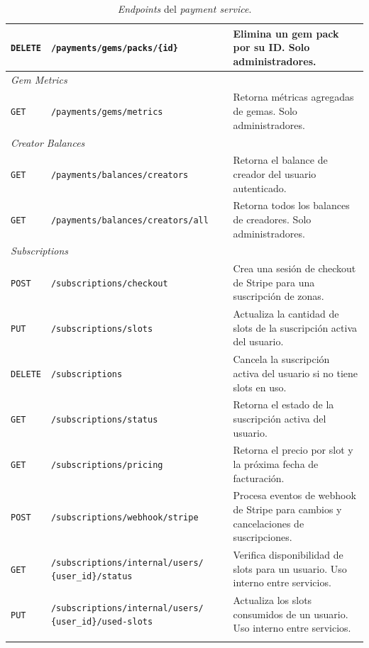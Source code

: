 \begin{longtable}{|p{2cm}|p{7cm}|p{5.5cm}|}
\hline
\texttt{DELETE} & \texttt{/payments/gems/packs/\{id\}}                          & Elimina un gem pack por su ID. Solo administradores. \\
\hline
\multicolumn{3}{|l|}{\textit{Gem Metrics}} \\
\hline
\texttt{GET}    & \texttt{/payments/gems/metrics}                               & Retorna métricas agregadas de gemas. Solo administradores. \\
\hline
\multicolumn{3}{|l|}{\textit{Creator Balances}} \\
\hline
\texttt{GET}    & \texttt{/payments/balances/creators}                          & Retorna el balance de creador del usuario autenticado. \\
\hline
\texttt{GET}    & \texttt{/payments/balances/creators/all}                      & Retorna todos los balances de creadores. Solo administradores. \\
\hline
\multicolumn{3}{|l|}{\textit{Subscriptions}} \\
\hline
\texttt{POST}   & \texttt{/subscriptions/checkout}                              & Crea una sesión de checkout de Stripe para una suscripción de zonas. \\
\hline
\texttt{PUT}    & \texttt{/subscriptions/slots}                                 & Actualiza la cantidad de slots de la suscripción activa del usuario. \\
\hline
\texttt{DELETE} & \texttt{/subscriptions}                                       & Cancela la suscripción activa del usuario si no tiene slots en uso. \\
\hline
\texttt{GET}    & \texttt{/subscriptions/status}                                & Retorna el estado de la suscripción activa del usuario. \\
\hline
\texttt{GET}    & \texttt{/subscriptions/pricing}                               & Retorna el precio por slot y la próxima fecha de facturación. \\
\hline
\texttt{POST}   & \texttt{/subscriptions/webhook/stripe}                        & Procesa eventos de webhook de Stripe para cambios y cancelaciones de suscripciones. \\
\hline
\texttt{GET}    & \texttt{/subscriptions/internal/users/} \newline \texttt{\{user\_id\}/status} & Verifica disponibilidad de slots para un usuario. Uso interno entre servicios. \\
\hline
\texttt{PUT}    & \texttt{/subscriptions/internal/users/} \newline \texttt{\{user\_id\}/used-slots} & Actualiza los slots consumidos de un usuario. Uso interno entre servicios. \\
\hline
\caption{\textit{Endpoints} del \textit{payment service}.}\label{tab:payment-endpoints}
\end{longtable}
